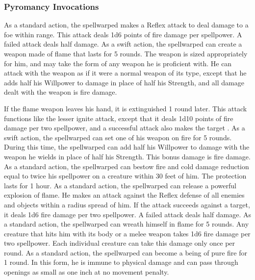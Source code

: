 \subsubsection{Pyromancy Invocations}
As a standard action, the spellwarped makes a Reflex attack to deal damage to a foe within \rngclose range.
This attack deals 1d6 points of fire damage  per spellpower.
A failed attack deals half damage.
As a swift action, the spellwarped can create a weapon made of flame that lasts for 5 rounds.
The weapon is sized appropriately for him, and may take the form of any weapon he is proficient with.
He can attack with the weapon as if it were a normal weapon of its type, except that he adds half his Willpower to damage in place of half his Strength, and all damage dealt with the weapon is fire damage.
\par If the flame weapon leaves his hand, it is extinguished 1 round later.
This attack functions like the lesser ignite attack, except that it deals 1d10 points of fire damage per two spellpower, and a successful attack also makes the target \ignited.
As a swift action, the spellwarped can set one of his weapon on fire for 5 rounds.
During this time, the spellwarped can add half his Willpower to damage with the weapon he wields in place of half his Strength.
This bonus damage is fire damage.
As a standard action, the spellwarped can bestow fire and cold damage reduction equal to twice his spellpower on a creature within 30 feet of him.
The protection lasts for 1 hour.
As a standard action, the spellwarped can release a powerful explosion of flame.
He makes an attack against the Reflex defense of all enemies and objects within a \areamed radius spread of him.
If the attack succeeds against a target, it deals 1d6 fire damage per two spellpower.
A failed attack deals half damage.
As a standard action, the spellwarped can wreath himself in flame for 5 rounds.
Any creature that hits him with its body or a melee weapon takes 1d6 fire damage per two spellpower.
Each individual creature can take this damage only once per round.
As a standard action, the spellwarped can become a being of pure fire for 1 round.
In this form, he is immune to physical damage and can pass through openings as small as one inch at no movement penalty.
